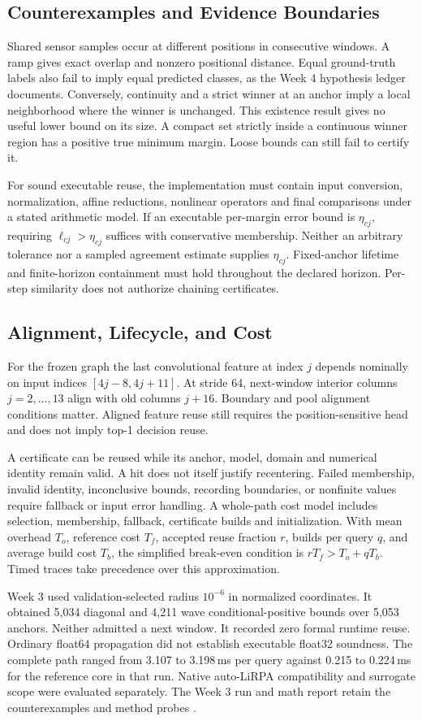 \documentclass[journal]{IEEEtran}
\begin{document}
\subsection{Counterexamples and Evidence Boundaries}
Shared sensor samples occur at different positions in consecutive windows. A ramp gives exact overlap and nonzero positional distance. Equal ground-truth labels also fail to imply equal predicted classes, as the Week 4 hypothesis ledger documents. Conversely, continuity and a strict winner at an anchor imply a local neighborhood where the winner is unchanged. This existence result gives no useful lower bound on its size. A compact set strictly inside a continuous winner region has a positive true minimum margin. Loose bounds can still fail to certify it.
\par
For sound executable reuse, the implementation must contain input conversion, normalization, affine reductions, nonlinear operators and final comparisons under a stated arithmetic model. If an executable per-margin error bound is $\eta_{cj}$, requiring $\ell_{cj}>\eta_{cj}$ suffices with conservative membership. Neither an arbitrary tolerance nor a sampled agreement estimate supplies $\eta_{cj}$. Fixed-anchor lifetime and finite-horizon containment must hold throughout the declared horizon. Per-step similarity does not authorize chaining certificates.
\subsection{Alignment, Lifecycle, and Cost}
For the frozen graph the last convolutional feature at index $j$ depends nominally on input indices $[4j-8,4j+11]$. At stride 64, next-window interior columns $j=2,\ldots,13$ align with old columns $j+16$. Boundary and pool alignment conditions matter. Aligned feature reuse still requires the position-sensitive head and does not imply top-1 decision reuse.
\par
A certificate can be reused while its anchor, model, domain and numerical identity remain valid. A hit does not itself justify recentering. Failed membership, invalid identity, inconclusive bounds, recording boundaries, or nonfinite values require fallback or input error handling. A whole-path cost model includes selection, membership, fallback, certificate builds and initialization. With mean overhead $T_o$, reference cost $T_f$, accepted reuse fraction $r$, builds per query $q$, and average build cost $T_b$, the simplified break-even condition is $rT_f>T_o+qT_b$. Timed traces take precedence over this approximation.
\par
Week 3 used validation-selected radius $10^{-6}$ in normalized coordinates. It obtained 5,034 diagonal and 4,211 wave conditional-positive bounds over 5,053 anchors. Neither admitted a next window. It recorded zero formal runtime reuse. Ordinary float64 propagation did not establish executable float32 soundness. The complete path ranged from 3.107 to 3.198\,ms per query against 0.215 to 0.224\,ms for the reference core in that run. Native auto-LiRPA compatibility and surrogate scope were evaluated separately. The Week 3 run and math report retain the counterexamples and method probes \cite{localw3}.
\end{document}
